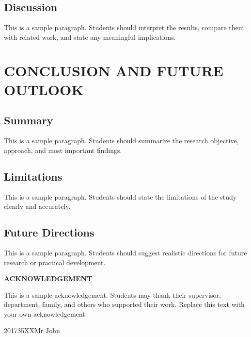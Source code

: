 \documentclass[12pt,fleqn]{report}
\newcommand{\studentname}{Mr John}
\newcommand{\studentid}{201735XX}
\begin{document}
\section{Discussion}
This is a sample paragraph. Students should interpret the results, compare them with related work, and state any meaningful implications.
\par
\chapter{CONCLUSION AND FUTURE OUTLOOK}

\section{Summary}
This is a sample paragraph. Students should summarize the research objective, approach, and most important findings.

\section{Limitations}
This is a sample paragraph. Students should state the limitations of the study clearly and accurately.

\section{Future Directions}
This is a sample paragraph. Students should suggest realistic directions for future research or practical development.

\newpage
\renewcommand\bibname{REFERENCES}



\newpage
\begin{center}
{\large\bfseries ACKNOWLEDGEMENT}
\end{center}
\vspace{1em}

This is a sample acknowledgement. Students may thank their supervisor, department, family, and others who supported their work. Replace this text with your own acknowledgement.

\vspace{2em}
\begin{flushright}
\studentid\quad \studentname
\end{flushright}
\end{document}
